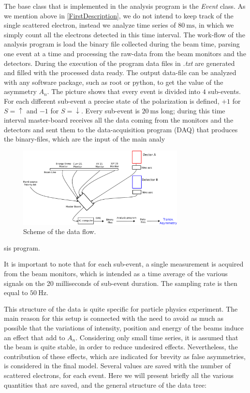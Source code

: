 The base class that is implemented in the analysis program is the \textit{Event} class. As we mention above in \ref{FirstDescription}, we do not intend to keep track of the single scattered electron, instead we analyze time series of $\SI{80}{\milli \second}$, in which we simply count all the electrons detected in this time interval. The work-flow of the analysis program is load the binary file collected during the beam time, parsing  one event at a time and processing the raw-data from the beam monitors and the detectors. During the execution of the program data files in \textit{.txt} are generated and filled with the processed data ready. The output data-file can be analyzed with any software package, such as root or python, to get the value of the asymmetry $A_{n}$. 
The picture shows that every event is divided into $4$ sub-events. For each different sub-event a precise state of the polarization is defined, 
$+1$ for $S = \uparrow$ and $-1$ for $S = \downarrow$. Every sub-event is $\SI{20}{\milli \second}$ long; during this time interval master-board receives all the data coming from the monitors and the detectors and sent them to the data-acquisition program (DAQ) that produces the binary-files, which are the input of the main analy\begin{figure}[hbtp]

\centering
\includegraphics[width = 0.75\textwidth]{Analysis/Electronic_scheme.pdf}
\caption{Scheme of the data flow.}
\end{figure}
sis program.

 It is important to note that for each sub-event, a single measurement is acquired from the beam monitors, which is intended as a time average of the various signals on the 20 milliseconds of sub-event duration. The sampling rate is then equal to $\SI{50}{\hertz}$.

This structure of the data is quite specific for particle physics experiment. The main reason for this setup is connected with the need to avoid as much as possible that the variations of intensity, position and energy of the beams induce an effect that add to $A_{n}$. Considering only small time series, it is assumed that the beam is quite stable, in order to reduce undesired effects.
Nevertheless, the contribution of these effects, which are indicated for brevity as false asymmetries, is considered in the final model.
Several values are saved with the number of scattered electrons, for each event. Here we will present briefly all the various quantities that are saved, and the general structure of the data tree:

